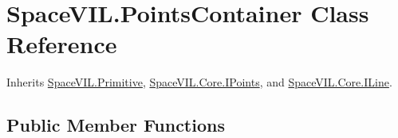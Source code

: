 \hypertarget{class_space_v_i_l_1_1_points_container}{}\section{Space\+V\+I\+L.\+Points\+Container Class Reference}
\label{class_space_v_i_l_1_1_points_container}


Inherits \mbox{\hyperlink{class_space_v_i_l_1_1_primitive}{Space\+V\+I\+L.\+Primitive}}, \mbox{\hyperlink{interface_space_v_i_l_1_1_core_1_1_i_points}{Space\+V\+I\+L.\+Core.\+I\+Points}}, and \mbox{\hyperlink{interface_space_v_i_l_1_1_core_1_1_i_line}{Space\+V\+I\+L.\+Core.\+I\+Line}}.

\subsection*{Public Member Functions}
